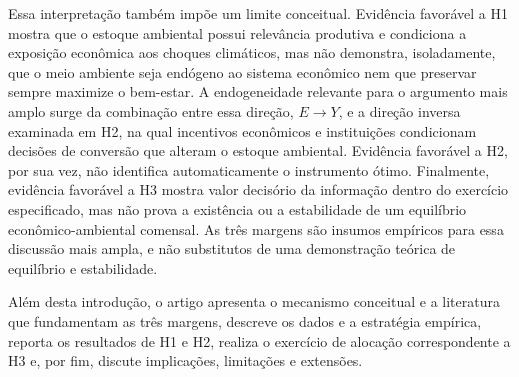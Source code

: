 Essa interpretação também impõe um limite conceitual. Evidência favorável a H1 mostra que o estoque ambiental possui relevância produtiva e condiciona a exposição econômica aos choques climáticos, mas não demonstra, isoladamente, que o meio ambiente seja endógeno ao sistema econômico nem que preservar sempre maximize o bem-estar. A endogeneidade relevante para o argumento mais amplo surge da combinação entre essa direção, $E\rightarrow Y$, e a direção inversa examinada em H2, na qual incentivos econômicos e instituições condicionam decisões de conversão que alteram o estoque ambiental. Evidência favorável a H2, por sua vez, não identifica automaticamente o instrumento ótimo. Finalmente, evidência favorável a H3 mostra valor decisório da informação dentro do exercício especificado, mas não prova a existência ou a estabilidade de um equilíbrio econômico-ambiental comensal. As três margens são insumos empíricos para essa discussão mais ampla, e não substitutos de uma demonstração teórica de equilíbrio e estabilidade.

Além desta introdução, o artigo apresenta o mecanismo conceitual e a literatura que fundamentam as três margens, descreve os dados e a estratégia empírica, reporta os resultados de H1 e H2, realiza o exercício de alocação correspondente a H3 e, por fim, discute implicações, limitações e extensões.
